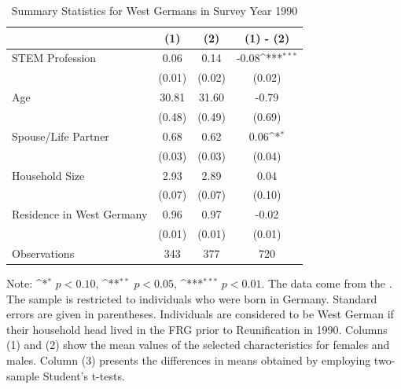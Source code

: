 \documentclass[a4paper, oneside, hyperfootnotes = false]{article}
\def\sym#1{\ifmmode^{#1}\else\(^{#1}\)\fi}
\begin{document}
{\begin{table}[ht]
\begin{center}
	\end{center}
\end{table}

\begin{table}[ht]
    \caption{Summary Statistics for West Germans in Survey Year 1990}
    \label{tab:descr_summary_west}
    \begin{center}
        \begin{tabular}{l*{3}{c}}
        	\toprule
        	& (1) & (2) & (1) - (2) \\
        	\midrule
        	STEM Profession & 0.06  & 0.14 &  -0.08\sym{***}      \\
        	&   (0.01)  & (0.02) & (0.02) \\
        	\addlinespace
        	Age         & 30.81     &  31.60   &    -0.79     \\
        	&     (0.48) &        (0.49)         &      (0.69) \\
        	\addlinespace
        	Spouse/Life Partner & 0.68       &  0.62   &     0.06\sym{*}      \\
        	&      (0.03)&          (0.03)&         (0.04) \\
        	\addlinespace
        	Household Size      &  2.93   &  2.89   &    0.04       \\
        	&          (0.07)&       (0.07)        &      (0.10)\\
        	\addlinespace
        	Residence in West Germany& 0.96    &  0.97   &    -0.02        \\
        	&         (0.01) &       (0.01)&  (0.01)\\
        	\midrule
        	Observations        &        343 &     377     &       720                \\
        	\bottomrule
        \end{tabular}
        
        \vspace{2mm}
        
        \parbox{10cm}{
        \linespread{1}\footnotesize Note: \sym{*} \(p<0.10\), \sym{**} \(p<0.05\), \sym{***} \(p<0.01\). The data come from the \cite{SOEP2023}. The sample is restricted to individuals who were born in Germany. Standard errors are given in parentheses. Individuals are considered to be West German if their household head lived in the FRG prior to Reunification in 1990. Columns (1) and (2) show the mean values of the selected characteristics for females and males. Column (3) presents the differences in means obtained by employing two-sample Student's t-tests.}
        

\end{center}
\end{table}}
\end{document}
